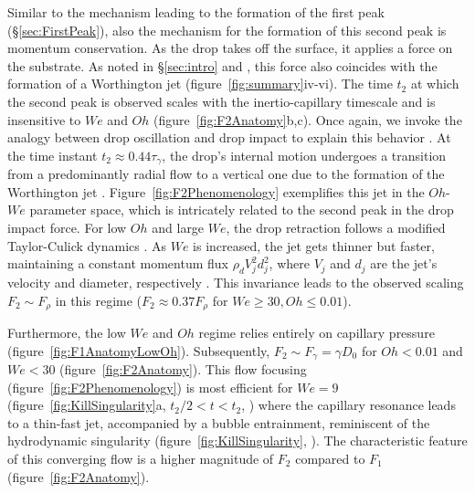 \documentclass{jfm}
\begin{document}
	Similar to the mechanism leading to the formation of the first peak (\S\ref{sec:FirstPeak}), also the mechanism for the formation of this second peak is momentum conservation. As the drop takes off the surface, it applies a force on the substrate. As noted in \S\ref{sec:intro} and \citet{zhang2022impact}, this force also coincides with the formation of a Worthington jet (figure~\ref{fig:summary}iv-vi). The time $t_2$ at which the second peak is observed scales with the inertio-capillary timescale and is insensitive to $We$ and $Oh$ (figure~\ref{fig:F2Anatomy}b,c). Once again, we invoke the analogy between drop oscillation and drop impact to explain this behavior  \citep{Richard2002, chevy2012liquid}. At the time instant $t_2 \approx 0.44\tau_\gamma$, the drop's internal motion undergoes a transition from a predominantly radial flow to a vertical one due to the formation of the Worthington jet \citep{chantelot2018rebonds, zhang2022impact}. Figure~\ref{fig:F2Phenomenology} exemplifies this jet in the $Oh$-$We$ parameter space, which is intricately related to the second peak in the drop impact force. For low $Oh$ and large $We$, the drop retraction follows a modified Taylor-Culick dynamics \citep{bartolo2005retraction, Eggers2010, sanjay2022TC}. As $We$ is increased, the jet gets thinner but faster, maintaining a constant momentum flux $\rho_dV_j^2d_j^2$, where $V_j$ and $d_j$ are the jet's velocity and diameter, respectively \citep[figure~\ref{fig:F2Phenomenology},][]{zhang2022impact}. This invariance leads to the observed scaling $F_2 \sim F_\rho$ in this regime ($F_2 \approx 0.37F_\rho$ for $We \ge 30, Oh \le 0.01$).
	
	Furthermore, the low $We$ and $Oh$ regime relies entirely on capillary pressure (figure~\ref{fig:F1AnatomyLowOh}). Subsequently, $F_2 \sim F_\gamma = \gamma D_0$ for $Oh < 0.01$ and $We < 30$ (figure~\ref{fig:F2Anatomy}). This flow focusing (figure~\ref{fig:F2Phenomenology}) is most efficient for $We = 9$ (figure~\ref{fig:KillSingularity}a, $t_2/2 < t < t_2$, \citealp{renardy2003pyramidal, Bartolo2006Singular}) where the capillary resonance leads to a thin-fast jet, accompanied by a bubble entrainment, reminiscent of the hydrodynamic singularity (figure~\ref{fig:KillSingularity}, \citealp{zhang2022impact, sanjay_lohse_jalaal_2021}). The characteristic feature of this converging flow is a higher magnitude of $F_2$ compared to $F_1$ (figure~\ref{fig:F2Anatomy}). 
	
\end{document}
